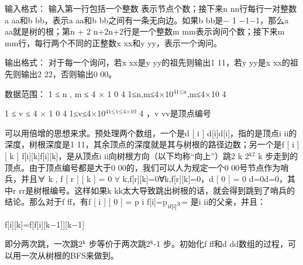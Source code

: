 \documentclass[9pt, b5paper]{article}
\begin{document}
输入格式：
输入第一行包括一个整数 表示节点个数；接下来n nn行每行一对整数a aa和b bb，表示a aa和b bb之间有一条无向边。如果b bb是− 1 −1−1，那么a aa就是树的根；第n + 2 n+2n+2行是一个整数m mm表示询问个数；接下来m mm行，每行两个不同的正整数x xx和y yy，表示一个询问。

输出格式：
对于每一个询问，若x xx是y yy的祖先则输出1 11，若y yy是x xx的祖先则输出2 22，否则输出0 00。

数据范围：
1 ≤ n , m ≤ 4 × 1 0 4 1≤n,m≤4×10$^{\text{41≤n}}$,m≤4×10 
4

1 ≤ v ≤ 4 × 1 0 4 1≤v≤4×10$^{\text{41≤v≤4×10}}$ 
4
 ，v vv是顶点编号

可以用倍增的思想来求。预处理两个数组，一个是d [ i ] d[i]d[i]，指的是顶点i ii的深度，树根深度是1 11，其余顶点的深度就是其与树根的路径边数；另一个是f [ i ] [ k ] f[i][k]f[i][k]，是从顶点i ii向树根方向（以下均称“向上”）跳2 k 2$^{\text{k2}}$ 
k
 步走到的顶点。由于顶点编号都是大于0 00的，我们可以人为规定一个0 00号节点作为哨兵，并且∀ k , f [ r ] [ k ] = 0 $\forall$ k,f[r][k]=0∀k,f[r][k]=0，d [ 0 ] = 0 d\footnotemark[3]{}=0d\footnotemark[3]{}=0，其中r rr是树根编号。这样如果k kk太大导致跳出树根的话，就会得到跳到了哨兵的结论。那么对于f ff，有f [ i ] [ 0 ] = p i f[i]\footnotemark[3]{}=p$_{\text{if[i]}\footnotemark[3]{}}$= 是i ii的父亲，并且：

f[i][k]=f[f[i][k−1]][k−1]

即分两次跳，一次跳2$^{\text{k}}$ 步等价于两次跳2$^{\text{k}}$-1 步。初始化f ff和d dd数组的过程，可以用一次从树根的BFS来做到。
\end{document}
